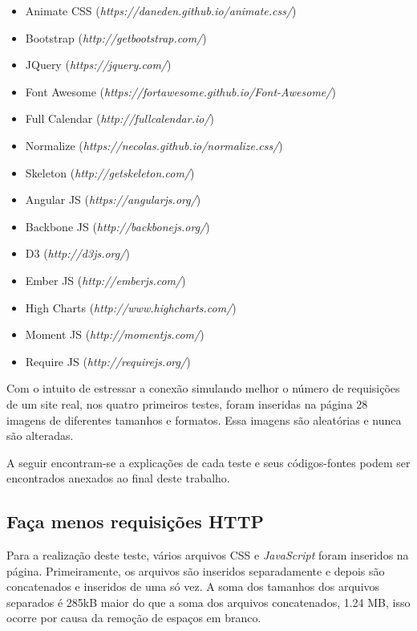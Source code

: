 \begin{itemize}
	\item Animate CSS (\textit{https://daneden.github.io/animate.css/})
	\item Bootstrap (\textit{http://getbootstrap.com/})
	\item JQuery (\textit{https://jquery.com/})
	\item Font Awesome (\textit{https://fortawesome.github.io/Font-Awesome/})
	\item Full Calendar (\textit{http://fullcalendar.io/})
	\item Normalize (\textit{https://necolas.github.io/normalize.css/})
	\item Skeleton (\textit{http://getskeleton.com/})
	\item Angular JS (\textit{https://angularjs.org/})
	\item Backbone JS (\textit{http://backbonejs.org/})
	\item D3 (\textit{http://d3js.org/})
	\item Ember JS (\textit{http://emberjs.com/})
	\item High Charts (\textit{http://www.highcharts.com/})
	\item Moment JS (\textit{http://momentjs.com/})
	\item Require JS (\textit{http://requirejs.org/})
\end{itemize}

Com o intuito de estressar a conexão simulando melhor o número de requisições de um site real, nos quatro primeiros testes, foram inseridas na página 28 imagens de diferentes tamanhos e formatos. Essa imagens são aleatórias e nunca são alteradas.

A seguir encontram-se a explicações de cada teste e seus códigos-fontes podem ser encontrados anexados ao final deste trabalho.

\subsection{Faça menos requisições HTTP}
\label{facamenosrequisicoeshttp}

Para a realização deste teste, vários arquivos CSS e \textit{JavaScript} foram inseridos na página. Primeiramente, os arquivos são inseridos separadamente e depois são concatenados e inseridos de uma só vez. A soma dos tamanhos dos arquivos separados é 285kB maior do que a soma dos arquivos concatenados, 1.24 MB, isso ocorre por causa da remoção de espaços em branco.

